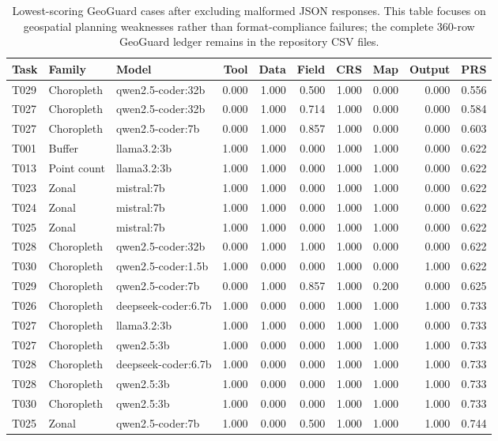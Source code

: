 \begin{table}[htbp]
\centering
\caption{Lowest-scoring GeoGuard cases after excluding malformed JSON responses. This table focuses on geospatial planning weaknesses rather than format-compliance failures; the complete 360-row GeoGuard ledger remains in the repository CSV files.}
\label{tab:geoguard-hard-cases}
\small
\setlength{\tabcolsep}{2pt}
\begin{tabular}{lllrrrrrrr}
\toprule
Task & Family & Model & Tool & Data & Field & CRS & Map & Output & PRS \\
\midrule
T029 & Choropleth & qwen2.5-coder:32b & 0.000 & 1.000 & 0.500 & 1.000 & 0.000 & 0.000 & 0.556 \\
T027 & Choropleth & qwen2.5-coder:32b & 0.000 & 1.000 & 0.714 & 1.000 & 0.000 & 0.000 & 0.584 \\
T027 & Choropleth & qwen2.5-coder:7b & 0.000 & 1.000 & 0.857 & 1.000 & 0.000 & 0.000 & 0.603 \\
T001 & Buffer & llama3.2:3b & 1.000 & 1.000 & 0.000 & 1.000 & 1.000 & 0.000 & 0.622 \\
T013 & Point count & llama3.2:3b & 1.000 & 1.000 & 0.000 & 1.000 & 1.000 & 0.000 & 0.622 \\
T023 & Zonal & mistral:7b & 1.000 & 1.000 & 0.000 & 1.000 & 1.000 & 0.000 & 0.622 \\
T024 & Zonal & mistral:7b & 1.000 & 1.000 & 0.000 & 1.000 & 1.000 & 0.000 & 0.622 \\
T025 & Zonal & mistral:7b & 1.000 & 1.000 & 0.000 & 1.000 & 1.000 & 0.000 & 0.622 \\
T028 & Choropleth & qwen2.5-coder:32b & 0.000 & 1.000 & 1.000 & 1.000 & 0.000 & 0.000 & 0.622 \\
T030 & Choropleth & qwen2.5-coder:1.5b & 1.000 & 0.000 & 0.000 & 1.000 & 0.000 & 1.000 & 0.622 \\
T029 & Choropleth & qwen2.5-coder:7b & 0.000 & 1.000 & 0.857 & 1.000 & 0.200 & 0.000 & 0.625 \\
T026 & Choropleth & deepseek-coder:6.7b & 1.000 & 0.000 & 0.000 & 1.000 & 1.000 & 1.000 & 0.733 \\
T027 & Choropleth & llama3.2:3b & 1.000 & 1.000 & 0.000 & 1.000 & 1.000 & 0.000 & 0.733 \\
T027 & Choropleth & qwen2.5:3b & 1.000 & 0.000 & 0.000 & 1.000 & 1.000 & 1.000 & 0.733 \\
T028 & Choropleth & deepseek-coder:6.7b & 1.000 & 0.000 & 0.000 & 1.000 & 1.000 & 1.000 & 0.733 \\
T028 & Choropleth & qwen2.5:3b & 1.000 & 0.000 & 0.000 & 1.000 & 1.000 & 1.000 & 0.733 \\
T030 & Choropleth & qwen2.5:3b & 1.000 & 0.000 & 0.000 & 1.000 & 1.000 & 1.000 & 0.733 \\
T025 & Zonal & qwen2.5-coder:7b & 1.000 & 0.000 & 0.500 & 1.000 & 1.000 & 1.000 & 0.744 \\
\bottomrule
\end{tabular}
\end{table}

